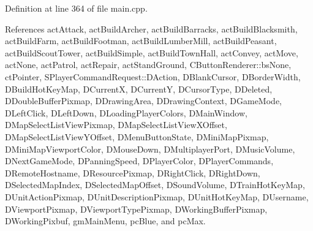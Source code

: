 Definition at line 364 of file main.\+cpp.



References act\+Attack, act\+Build\+Archer, act\+Build\+Barracks, act\+Build\+Blacksmith, act\+Build\+Farm, act\+Build\+Footman, act\+Build\+Lumber\+Mill, act\+Build\+Peasant, act\+Build\+Scout\+Tower, act\+Build\+Simple, act\+Build\+Town\+Hall, act\+Convey, act\+Move, act\+None, act\+Patrol, act\+Repair, act\+Stand\+Ground, C\+Button\+Renderer\+::bs\+None, ct\+Pointer, S\+Player\+Command\+Request\+::\+D\+Action, D\+Blank\+Cursor, D\+Border\+Width, D\+Build\+Hot\+Key\+Map, D\+CurrentX, D\+CurrentY, D\+Cursor\+Type, D\+Deleted, D\+Double\+Buffer\+Pixmap, D\+Drawing\+Area, D\+Drawing\+Context, D\+Game\+Mode, D\+Left\+Click, D\+Left\+Down, D\+Loading\+Player\+Colors, D\+Main\+Window, D\+Map\+Select\+List\+View\+Pixmap, D\+Map\+Select\+List\+View\+X\+Offset, D\+Map\+Select\+List\+View\+Y\+Offset, D\+Menu\+Button\+State, D\+Mini\+Map\+Pixmap, D\+Mini\+Map\+Viewport\+Color, D\+Mouse\+Down, D\+Multiplayer\+Port, D\+Music\+Volume, D\+Next\+Game\+Mode, D\+Panning\+Speed, D\+Player\+Color, D\+Player\+Commands, D\+Remote\+Hostname, D\+Resource\+Pixmap, D\+Right\+Click, D\+Right\+Down, D\+Selected\+Map\+Index, D\+Selected\+Map\+Offset, D\+Sound\+Volume, D\+Train\+Hot\+Key\+Map, D\+Unit\+Action\+Pixmap, D\+Unit\+Description\+Pixmap, D\+Unit\+Hot\+Key\+Map, D\+Username, D\+Viewport\+Pixmap, D\+Viewport\+Type\+Pixmap, D\+Working\+Buffer\+Pixmap, D\+Working\+Pixbuf, gm\+Main\+Menu, pc\+Blue, and pc\+Max.


